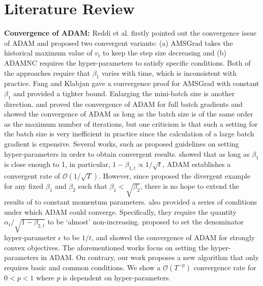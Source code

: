 \documentclass[twoside]{article}
\def\OO{\mathcal{O}}
\begin{document}
\section{Literature Review}
\textbf{Convergence of ADAM:} Reddi et al. \cite{reddi2019convergence} firstly pointed out the convergence issue of ADAM and proposed two convergent variants: (a) AMSGrad takes the historical maximum value of $v_t$ to keep the step size decreasing and (b) ADAMNC requires the hyper-parameters to satisfy specific conditions. Both of the approaches require that $\beta_1$ varies with time, which is inconsistent with practice. Fang and Klabjan \cite{fang2019convergence} gave a convergence proof for AMSGrad with constant $\beta_1$ and \cite{alacaoglu2020new} provided a tighter bound. Enlarging the mini-batch size is another direction. \cite{de2018convergence} and \cite{shi2020rmsprop} proved the convergence of ADAM for full batch gradients and \cite{zaheer2018adaptive} showed the convergence of ADAM as long as the batch size is of the same order as the maximum number of iterations, but one criticism is that such a setting for the batch size is very inefficient in practice since the calculation of a large batch gradient is expensive. Several works, such as \cite{guo2021novel, zou2019sufficient, wang2019sadam} proposed guidelines on setting hyper-parameters in order to obtain convergent results.  \cite{guo2021novel} showed that as long as $\beta_1$ is close enough to 1, in particular, $1-\beta_{1, t}\propto{1/\sqrt{t}}$, ADAM establishes a convergent rate of $\OO(1/\sqrt{T})$. However, since \cite{reddi2019convergence} proposed the divergent example for any fixed $\beta_1$ and $\beta_2$ such that $\beta_1<\sqrt{\beta_2}$, there is no hope to extend the results of \cite{guo2021novel} to constant momentum parameters. \cite{zou2019sufficient} also provided a series of conditions under which ADAM could converge. Specifically, they require the quantity $\alpha_t/\sqrt{1-\beta_{2, t}}$ to be `almost' non-increasing. \cite{wang2019sadam} proposed to set the denominator hyper-parameter $\epsilon$ to be $1/t$, and showed the convergence of ADAM for strongly convex objectives. The aforementioned works focus on setting the hyper-parameters in ADAM. On contrary, our work proposes a new algorithm that only requires basic and common conditions. We show a $\OO(T^{-p})$ convergence rate for $0<p<1$ where $p$ is dependent on hyper-parameters.
\end{document}
